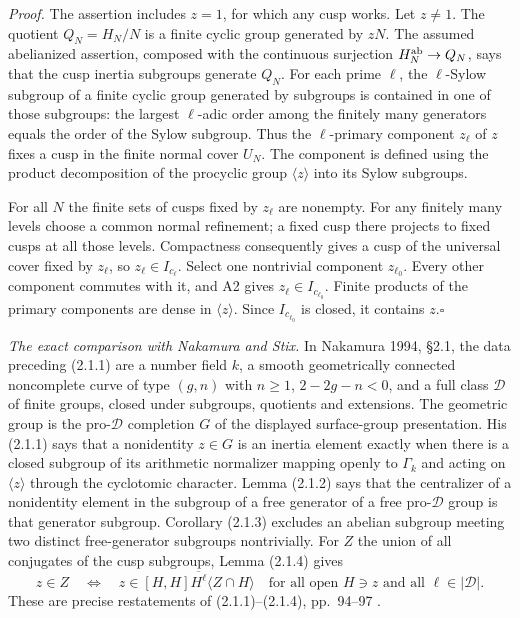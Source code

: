 \documentclass[11pt,a4paper]{article}
\begin{document}
\emph{Proof.} The assertion includes $z=1$, for which any cusp works. Let $z\ne1$. The quotient $Q_N=H_N/N$ is a finite cyclic group generated by $zN$. The assumed abelianized assertion, composed with the continuous surjection $H_N^{\rm ab}\to Q_N$, says that the cusp inertia subgroups generate $Q_N$. For each prime $\ell$, the $\ell$-Sylow subgroup of a finite cyclic group generated by subgroups is contained in one of those subgroups: the largest $\ell$-adic order among the finitely many generators equals the order of the Sylow subgroup. Thus the $\ell$-primary component $z_\ell$ of $z$ fixes a cusp in the finite normal cover $U_N$. The component is defined using the product decomposition of the procyclic group $\langle z\rangle$ into its Sylow subgroups.

For all $N$ the finite sets of cusps fixed by $z_\ell$ are nonempty. For any finitely many levels choose a common normal refinement; a fixed cusp there projects to fixed cusps at all those levels. Compactness consequently gives a cusp of the universal cover fixed by $z_\ell$, so $z_\ell\in I_{c_\ell}$. Select one nontrivial component $z_{\ell_0}$. Every other component commutes with it, and A2 gives $z_\ell\in I_{c_{\ell_0}}$. Finite products of the primary components are dense in $\langle z\rangle$. Since $I_{c_{\ell_0}}$ is closed, it contains $z$.\hfill$\square$

\emph{The exact comparison with Nakamura and Stix.} In Nakamura 1994, \S2.1, the data preceding (2.1.1) are a number field $k$, a smooth geometrically connected noncomplete curve of type $(g,n)$ with $n\ge1$, $2-2g-n<0$, and a full class $\mathcal D$ of finite groups, closed under subgroups, quotients and extensions. The geometric group is the pro-$\mathcal D$ completion $G$ of the displayed surface-group presentation. His (2.1.1) says that a nonidentity $z\in G$ is an inertia element exactly when there is a closed subgroup of its arithmetic normalizer mapping openly to $\Gamma_k$ and acting on $\langle z\rangle$ through the cyclotomic character. Lemma (2.1.2) says that the centralizer of a nonidentity element in the subgroup of a free generator of a free pro-$\mathcal D$ group is that generator subgroup. Corollary (2.1.3) excludes an abelian subgroup meeting two distinct free-generator subgroups nontrivially. For $Z$ the union of all conjugates of the cusp subgroups, Lemma (2.1.4) gives
\[
 z\in Z\quad\Longleftrightarrow\quad
 z\in\overline{[H,H]H^\ell\langle Z\cap H\rangle}
 \quad\text{for all open }H\ni z\text{ and all }\ell\in|\mathcal D|.
\]
These are precise restatements of (2.1.1)--(2.1.4), pp.~94--97 \cite{Nakamura1994}.
\end{document}
